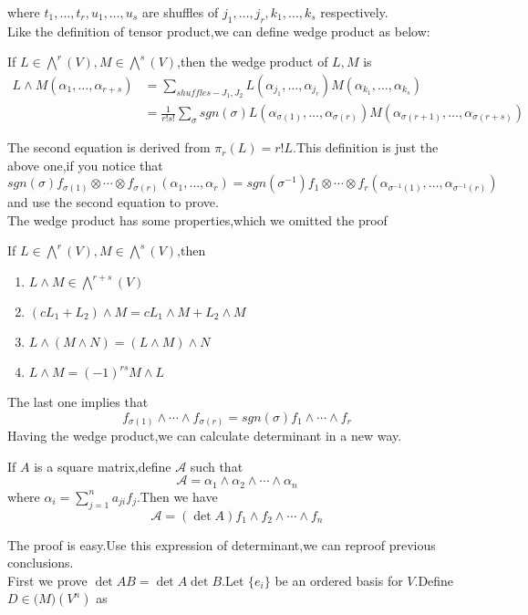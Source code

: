 \documentclass{article}
\begin{document}
where $t_1,\dots,t_r,u_1,\dots,u_s$ are shuffles of $j_1,\dots,j_r,k_1,\dots,k_s$ respectively.\\
Like the definition of tensor product,we can define wedge product as below:
\begin{dde}
	If $L\in\bigwedge^r(V),M\in\bigwedge^s(V)$,then the wedge product of $L,M$ is
	\begin{align*}
		L\wedge M(\alpha_1,\dots,\alpha_{r+s})&=\sum\limits_{shuffles-J_1,J_2}L(\alpha_{j_1},\dots,\alpha_{j_r})M(\alpha_{k_1},\dots,\alpha_{k_s})\\
		&=\frac{1}{r!s!}\sum\limits_{\sigma}sgn(\sigma)L(\alpha_{\sigma(1)},\dots,\alpha_{\sigma(r)})M(\alpha_{\sigma(r+1)},\dots,\alpha_{\sigma(r+s)})
	\end{align*}
\end{dde}
The second equation is derived from $\pi_r(L)=r!L$.This definition is just the above one,if you notice that
\[sgn(\sigma)f_{\sigma(1)}\otimes\cdots\otimes f_{\sigma(r)}(\alpha_1,\dots,\alpha_r)=sgn(\sigma^{-1})f_1\otimes\cdots\otimes f_r(\alpha_{\sigma^{-1}(1)},\dots,\alpha_{\sigma^{-1}(r)})\]
and use the second equation to prove.\\
\indent The wedge product has some properties,which we omitted the proof
\begin{thm}
	If $L\in\bigwedge^r(V),M\in\bigwedge^s(V)$,then
	\begin{enumerate}
		\item $L\wedge M\in\bigwedge^{r+s}(V)$
		\item $(cL_1+L_2)\wedge M=cL_1\wedge M+L_2\wedge M$
		\item $L\wedge(M\wedge N)=(L\wedge M)\wedge N$
		\item $L\wedge M=(-1)^{rs}M\wedge L$
	\end{enumerate}
\end{thm}
The last one implies that
\[f_{\sigma(1)}\wedge\cdots\wedge f_{\sigma(r)}=sgn(\sigma)f_1\wedge\cdots\wedge f_r\]
\indent Having the wedge product,we can calculate determinant in a new way.
\begin{thm}
	If $A$ is a square matrix,define $\mathcal{A}$ such that
	\[\mathcal{A}=\alpha_1\wedge\alpha_2\wedge\cdots\wedge\alpha_n\]
	where $\alpha_i=\sum\limits_{j=1}^na_{ji}f_j$.Then we have
	\[\mathcal{A}=(\det A)f_1\wedge f_2\wedge\cdots\wedge f_n\]
\end{thm}
The proof is easy.Use this expression of determinant,we can reproof previous conclusions.\\
First we prove $\det AB=\det A\det B$.Let $\{e_i\}$ be an ordered basis for $V$.Define $D\in\mathcal(M)(V^n)$ as
\end{document}
